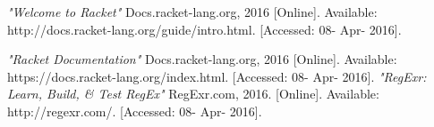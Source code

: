 \documentclass[12pt]{article}
\begin{document}

\begin{thebibliography}{10}

  \emph{"Welcome to Racket"}
   Docs.racket-lang.org, 
  2016 [Online]. 
 Available: http://docs.racket-lang.org/guide/intro.html. [Accessed: 08- Apr- 2016].
 
  \emph{"Racket Documentation"}
   Docs.racket-lang.org, 
  2016 [Online]. 
Available: https://docs.racket-lang.org/index.html. [Accessed: 08- Apr- 2016].
  \emph{"RegExr: Learn, Build, \& Test RegEx"}
   RegExr.com, 
2016. [Online]. Available: http://regexr.com/. [Accessed: 08- Apr- 2016]. 

\end{thebibliography}
\end{document}
